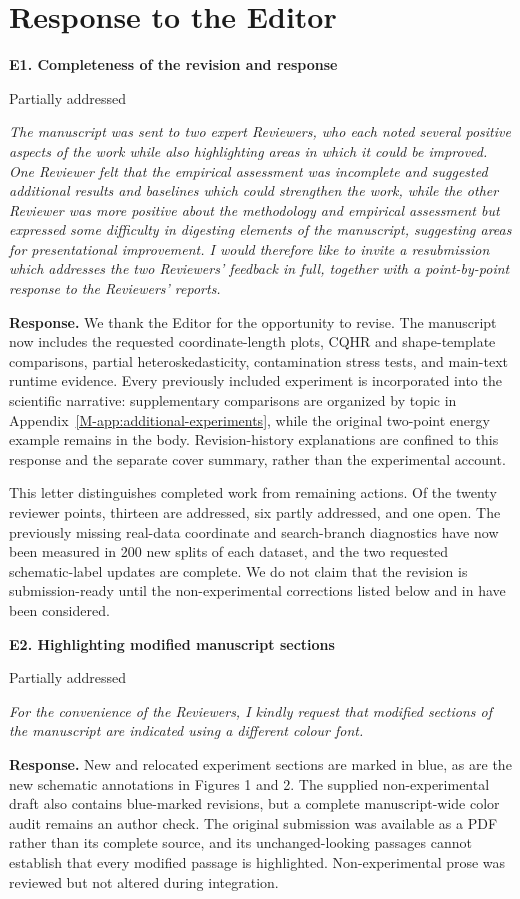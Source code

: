 \documentclass[11pt]{article}
\newcommand{\msapp}[1]{Appendix~\ref*{M-#1}}
\newcommand{\point}[3]{\par\Needspace{7\baselineskip}\medskip
\noindent\parbox[t]{0.77\linewidth}{\textbf{#1}}\hfill
\parbox[t]{0.21\linewidth}{\raggedleft\small\sffamily #2}\par\nopagebreak
{\color{ReviewerBlue}\small\itshape #3\par}\textbf{Response.} }
\begin{document}
\clearpage
\section*{Response to the Editor}

\point{E1. Completeness of the revision and response}{Partially addressed}{The manuscript was sent to two expert Reviewers, who each noted several
positive aspects of the work while also highlighting areas in which it
could be improved. One Reviewer felt that the empirical assessment was
incomplete and suggested additional results and baselines which could
strengthen the work, while the other Reviewer was more positive about the
methodology and empirical assessment but expressed some difficulty in
digesting elements of the manuscript, suggesting areas for presentational
improvement. I would therefore like to invite a resubmission which
addresses the two Reviewers' feedback in full, together with a
point-by-point response to the Reviewers' reports.}
\label{response:E1}
We thank the Editor for the opportunity to revise. The manuscript now includes the requested coordinate-length plots, CQHR and shape-template comparisons, partial heteroskedasticity, contamination stress tests, and main-text runtime evidence. Every previously included experiment is incorporated into the scientific narrative: supplementary comparisons are organized by topic in \msapp{app:additional-experiments}, while the original two-point energy example remains in the body. Revision-history explanations are confined to this response and the separate cover summary, rather than the experimental account.

This letter distinguishes completed work from remaining actions. Of the twenty reviewer points, thirteen are addressed, six partly addressed, and one open. The previously missing real-data coordinate and search-branch diagnostics have now been measured in 200 new splits of each dataset, and the two requested schematic-label updates are complete. We do not claim that the revision is submission-ready until the non-experimental corrections listed below and in  have been considered.

\point{E2. Highlighting modified manuscript sections}{Partially addressed}{For the convenience of the Reviewers, I kindly request that modified
sections of the manuscript are indicated using a different colour font.}
\label{response:E2}
New and relocated experiment sections are marked in blue, as are the new schematic annotations in Figures 1 and 2. The supplied non-experimental draft also contains blue-marked revisions, but a complete manuscript-wide color audit remains an author check. The original submission was available as a PDF rather than its complete source, and its unchanged-looking passages cannot establish that every modified passage is highlighted. Non-experimental prose was reviewed but not altered during integration.
\end{document}
